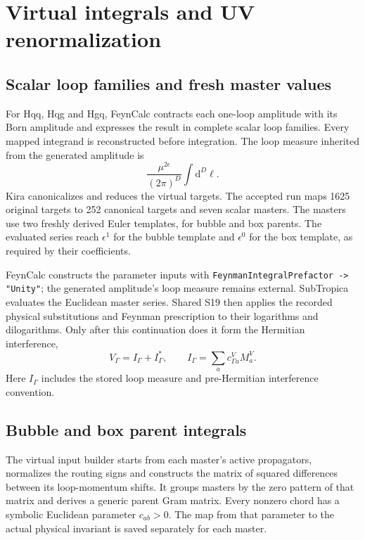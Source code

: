 \documentclass[11pt,a4paper]{article}
\newcommand{\dd}{\mathrm{d}}
\newcommand{\eps}{\epsilon}
\begin{document}
\section{Virtual integrals and UV renormalization}
\label{sec:virtual}

\subsection{Scalar loop families and fresh master values}

For Hqq, Hqg and Hgq, FeynCalc contracts each one-loop amplitude with its
Born amplitude and expresses the result in complete scalar loop families.
Every mapped integrand is reconstructed before integration. The loop
measure inherited from the generated amplitude is
\begin{equation}
 \frac{\mu^{2\eps}}{(2\pi)^D}\int\dd^D\ell.
\end{equation}
Kira canonicalizes and reduces the virtual targets. The accepted run maps
1625 original targets to 252 canonical targets and seven scalar masters.
The masters use two freshly derived Euler templates, for bubble and box
parents. The evaluated series reach $\eps^1$ for the bubble template and
$\eps^0$ for the box template, as required by their coefficients.

FeynCalc constructs the parameter inputs with
\texttt{FeynmanIntegralPrefactor -> "Unity"}; the generated amplitude's
loop measure remains external. SubTropica evaluates the Euclidean master
series. Shared S19 then applies the recorded physical substitutions and
Feynman prescription to their logarithms and dilogarithms. Only after this
continuation does it form the Hermitian interference,
\begin{equation}
 V_\Gamma=I_\Gamma+I_\Gamma^*,\qquad
 I_\Gamma=\sum_a c^{V}_{\Gamma a}M_a^V.
\end{equation}
Here $I_\Gamma$ includes the stored loop measure and pre-Hermitian
interference convention.

\subsection{Bubble and box parent integrals}

The virtual input builder starts from each master's active propagators,
normalizes the routing signs and constructs the matrix of squared
differences between its loop-momentum shifts. It groups masters by the
zero pattern of that matrix and derives a generic parent Gram matrix.
Every nonzero chord has a symbolic Euclidean parameter $c_{ab}>0$.
The map from that parameter to the actual physical invariant is saved
separately for each master.
\end{document}
